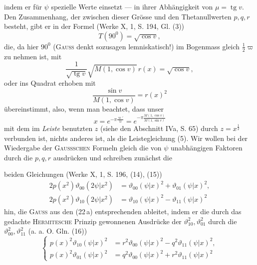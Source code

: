 indem er für \(\psi\) spezielle Werte einsetzt — in ihrer Abhängigkeit von \(\mu=\operatorname{tg}v\).
Den Zusammenhang, der zwischen dieser Grösse und den Thetanullwerten
\(p,q,r\) besteht, gibt er in der Formel (Werke X, 1, S. 194, Gl. (3))
\begingroup\makeatletter\tagsleft@true\let\veqno\leqno\makeatother
\begin{equation*}
T(90^{0})=\sqrt{\cos v},\tag{23}
\end{equation*}
\endgroup
\noindent die, da hier \(90^{0}\) (\textsc{Gauss} denkt sozusagen lemniskatisch!) im Bogenmass gleich
\(\tfrac12\varpi\) zu nehmen ist, mit
\[
\frac1{\sqrt{\operatorname{tg}v}}\sqrt{M(1,\cos v)}\,r(x)=\sqrt{\cos v},
\]
\noindent oder ins Quadrat erhoben mit
\begingroup\makeatletter\tagsleft@true\let\veqno\leqno\makeatother
\begin{equation*}
\frac{\sin v}{M(1,\cos v)}=r(x)^2\tag{23\,a}
\end{equation*}
\endgroup
\noindent übereinstimmt, also, wenn man beachtet, dass unser
\[
x=e^{-\pi\frac{\varpi'}{\varpi}}=e^{-\pi\frac{M(1,\cos v)}{M(1,\sin v)}}
\]
\noindent mit dem im \textit{Leiste} benutzten \(z\) (siehe den Abschnitt IVa, S. 65) durch
\(z=x^{\frac12}\) verbunden ist, nichts anderes ist, als die Leistegleichung (5). Wir
wollen bei der Wiedergabe der \textsc{Gaussschen} Formeln gleich die von \(\psi\) unabhängigen Faktoren durch die \(p,q,r\) ausdrücken und schreiben zunächst die\par
\clearpage{}
\noindent beiden Gleichungen (Werke X, 1, S. 196, (14), (15))
\begingroup\makeatletter\tagsleft@true\let\veqno\leqno\makeatother
\begin{align*}
2p(x^2)\vartheta_{00}(2\psi|x^2)&=\vartheta_{00}(\psi|x)^2+\vartheta_{01}(\psi|x)^2,\tag{24}\\
2p(x^2)\vartheta_{10}(2\psi|x^2)&=\vartheta_{10}(\psi|x)^2-\vartheta_{11}(\psi|x)^2\tag{25}
\end{align*}
\endgroup
\noindent hin, die \textsc{Gauss} aus den (22\,a) entsprechenden ableitet, indem er die durch das
gedachte \textsc{Hermitesche} Prinzip gewonnenen Ausdrücke der \(\vartheta_{10}^{2},\vartheta_{01}^{2}\) durch die
\(\vartheta_{00}^{2},\vartheta_{11}^{2}\) (a. a. O. Gln. (16))
\begingroup\makeatletter\tagsleft@true\let\veqno\leqno\makeatother
\begin{equation*}
\left\{\begin{aligned}
p(x)^2\vartheta_{10}(\psi|x)^2&=r^2\vartheta_{00}(\psi|x)^2-q^2\vartheta_{11}(\psi|x)^2,\\
p(x)^2\vartheta_{01}(\psi|x)^2&=q^2\vartheta_{00}(\psi|x)^2+r^2\vartheta_{11}(\psi|x)^2
\end{aligned}\right.\tag{26}
\end{equation*}
